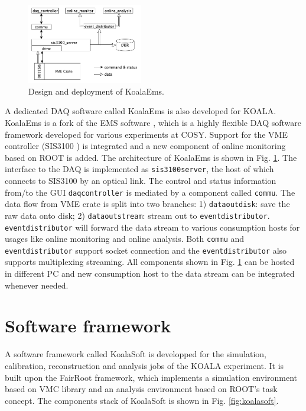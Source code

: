 \documentclass[number,5p]{elsarticle}
\begin{document}
\begin{figure}[htbp]
\centering
\includegraphics[width=0.45\textwidth]{./koalaems_deployment.png}
\caption{Design and deployment of KoalaEms.}
\label{fig:koalaems}
\end{figure}

A dedicated DAQ software called KoalaEms is also developed for KOALA.
KoalaEms is a fork of the EMS software \cite{ems}, which is a highly flexible DAQ software framework developed for various experiments at COSY.
Support for the VME controller (SIS3100 \cite{sis}) is integrated and a new component of online monitoring based on ROOT is added.
The architecture of KoalaEms is shown in Fig. \ref{fig:koalaems}.
The interface to the DAQ is implemented as \linebreak\texttt{sis3100\textunderscore server}, the host of which
connects to SIS3100 by an optical link.
The control and status information from/to the GUI \texttt{daq\textunderscore controller} is mediated by a component called \texttt{commu}.
The data flow from VME crate is split into two branches: 1) \texttt{data\textunderscore out\textunderscore disk}: save the raw data onto disk; 2) \texttt{data\textunderscore out\textunderscore stream}: stream out to \texttt{event\textunderscore distributor}.
\texttt{event\textunderscore distributor} will forward the data stream to various consumption hosts for usages like online monitoring and online analysis.
Both \texttt{commu} and \texttt{event\textunderscore distributor} support socket connection and the \texttt{event\textunderscore distributor} also supports multiplexing streaming.
All components shown in Fig. \ref{fig:koalaems} can be hosted in different PC and new consumption host to the data stream can be integrated whenever needed.

\section{Software framework}
\label{sec:software}

A software framework called KoalaSoft is developped for the simulation, calibration, reconstruction and analysis jobs of the KOALA experiment.
It is built upon the FairRoot \cite{fairroot} framework, which implements a simulation environment based on VMC \cite{vmc} library and an analysis environment based on ROOT's task concept.
The components stack of KoalaSoft is shown in Fig. \ref{fig:koalasoft}.
\end{document}
